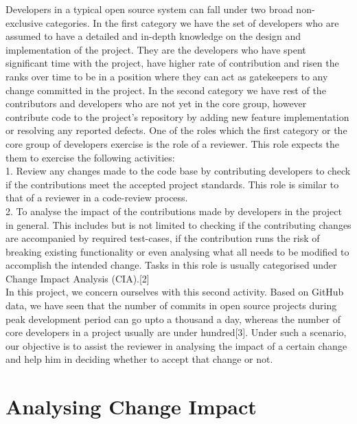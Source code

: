 Developers in a typical open source system can fall under two broad non-exclusive categories. In the first category we have the set of developers who are assumed to have a detailed and in-depth knowledge on the design and implementation of the project. They are the developers who have spent significant time with the project, have higher rate of contribution and risen the ranks over time to be in a position where they can act as gatekeepers to any change committed in the project. In the second category we have rest of the contributors and developers who are not yet in the core group, however contribute code to the project's  repository by adding new feature implementation or resolving any reported defects. One of the roles which the first category or the core group of developers exercise is the role of a reviewer. This role expects the them to exercise the following activities:\\
1. Review any changes made to the code base by contributing developers to check if the contributions meet the accepted project standards. This role is similar to that of a reviewer in a code-review process.\\
2. To analyse the impact of the contributions made by developers in the project in general. This includes but is not limited to checking if the contributing changes are accompanied by required test-cases, if the contribution runs the risk of breaking existing functionality or even analysing what all needs to be modified to accomplish the intended change. Tasks in this role is usually categorised under Change Impact Analysis (CIA).[2] \\
In this project, we concern ourselves with this second activity. Based on GitHub data, we have seen that the number of commits in open source projects during peak development period can go upto a thousand a day, whereas the number of core developers in a project usually are under hundred[3]. Under such a scenario, our objective is to assist the reviewer in analysing the impact of a certain change and help him in deciding whether to accept that change or not.\\

\section{Analysing Change Impact}

